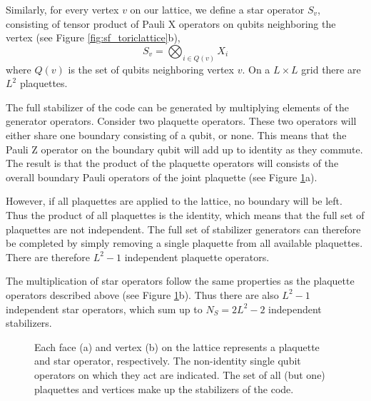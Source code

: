 Similarly, for every vertex $v$ on our lattice, we define a star operator $S_v$, consisting of tensor product of Pauli X operators on qubits neighboring the vertex (see Figure \ref{fig:sf_toriclattice}b),
\begin{equation}\label{eq:sf_plaquette}
  S_v = \bigotimes_{i\in Q(v)} X_i
\end{equation}
where $Q(v)$ is the set of qubits neighboring vertex $v$. On a $L\times L$ grid there are $L^2$ plaquettes.

The full stabilizer of the code can be generated by multiplying elements of the generator operators. Consider two plaquette operators. These two operators will either share one boundary consisting of a qubit, or none. This means that the Pauli Z operator on the boundary qubit will add up to identity as they commute. The result is that the product of the plaquette operators will consists of the overall boundary Pauli operators of the joint plaquette (see Figure \ref{fig:sf_multistab}a).

However, if all plaquettes are applied to the lattice, no boundary will be left. Thus the product of all plaquettes is the identity, which means that the full set of plaquettes are not independent. The full set of stabilizer generators can therefore be completed by simply removing a single plaquette from all available plaquettes. There are therefore $L^2 - 1$ independent plaquette operators. 

The multiplication of star operators follow the same properties as the plaquette operators described above (see Figure \ref{fig:sf_multistab}b). Thus there are also $L^2 - 1$ independent star operators, which sum up to $N_S = 2L^2 - 2$ independent stabilizers. 

\begin{figure}
  \centering
  \hspace{1cm}
  \caption{Each face (a) and vertex (b) on the lattice represents a plaquette and star operator, respectively. The non-identity single qubit operators on which they act are indicated. The set of all (but one) plaquettes and vertices make up the stabilizers of the code. }\label{fig:sf_multistab}
\end{figure}


